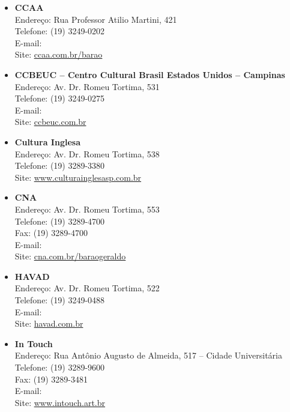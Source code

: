 \begin{itemize}
    \item   \textbf{CCAA}
        \\Endereço: Rua Professor Atilio Martini, 421
        \\Telefone: (19) 3249-0202
        \\E-mail: 
        \\Site: \url{ccaa.com.br/barao}

    \item   \textbf{CCBEUC -- Centro Cultural Brasil Estados Unidos -- Campinas}
        \\Endereço: Av. Dr. Romeu Tortima, 531
        \\Telefone: (19) 3249-0275
        \\E-mail: 
        \\Site: \url{ccbeuc.com.br}
        
    \item   \textbf{Cultura Inglesa}
        \\Endereço: Av. Dr. Romeu Tortima, 538
        \\Telefone: (19) 3289-3380
        \\Site: \url{www.culturainglesasp.com.br}

    \item   \textbf{CNA}
        \\Endereço: Av. Dr. Romeu Tortima, 553
        \\Telefone: (19) 3289-4700
        \\Fax: (19) 3289-4700
        \\E-mail: 
        \\Site: \url{cna.com.br/baraogeraldo}

    \item   \textbf{HAVAD}
        \\Endereço: Av. Dr. Romeu Tortima, 522
        \\Telefone: (19) 3249-0488
        \\E-mail: 
        \\Site: \url{havad.com.br}

    \item   \textbf{In Touch}
        \\Endereço: Rua Antônio Augusto de Almeida, 517 -- Cidade Universitária
        \\Telefone: (19) 3289-9600
        \\Fax: (19) 3289-3481
        \\E-mail: 
        \\Site: \url{www.intouch.art.br}


\end{itemize}

